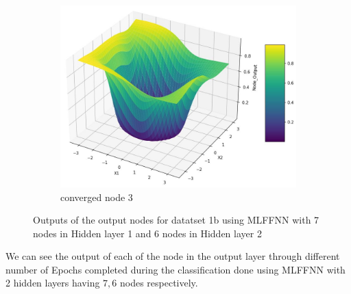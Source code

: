 \documentclass[11pt]{article}
\begin{document}
\begin{figure}[h!]
\begin{subfigure}[b]{0.45\textwidth}
	\includegraphics[scale=0.14]{output_n3_c.jpg}
	\caption{converged node 3}
	\label{fig:fig2.1.3.15}
	\end{subfigure}
\caption{Outputs of the output nodes for datatset 1b using MLFFNN with 7 nodes in Hidden layer 1 and 6 nodes in Hidden layer 2}
\label{fig:fig2.1.3}
\end{figure}
We can see the output of each of the node in the output layer through different number of Epochs completed during the classification done using MLFFNN with 2 hidden layers having $7,6$ nodes respectively.
\newpage
\end{document}
